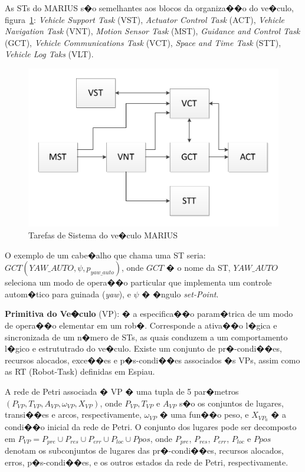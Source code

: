 As STs do MARIUS s�o semelhantes aos blocos da organiza��o do ve�culo,
figura~\ref{SILVA_2}:
\emph{Vehicle Support Task} (VST), \emph{Actuator Control Task} (ACT),
\emph{Vehicle Navigation Task} (VNT), \emph{Motion Sensor Task} (MST),
\emph{Guidance and Control Task} (GCT), \emph{Vehicle Communications Task}
(VCT), \emph{Space and Time Task} (STT), \emph{Vehicle Log Taks} (VLT). 

\begin{figure}[H]
\centering
\includegraphics[width=1\columnwidth]{figs/SILVA_2.pdf}
\caption{Tarefas de Sistema do ve�culo MARIUS}
\label{SILVA_2}
\end{figure}

O exemplo de um cabe�alho que chama uma ST seria:
$GCT(YAW\_AUTO,\psi,p_{yaw\_auto})$, onde $GCT$ � o nome da ST, $YAW\_AUTO$
seleciona um modo de opera��o particular que implementa um controle autom�tico
para guinada (\emph{yaw}), e $\psi$ � �ngulo \emph{set-Point}.

\textbf{Primitiva do Ve�culo} (VP): � a especifica��o param�trica de um modo
de opera��o elementar em um rob�. Corresponde a ativa��o l�gica e sincronizada
de um n�mero de STs, as quais conduzem a um comportamento l�gico e estrututrado
do ve�culo. Existe um conjunto de pr�-condi��es, recursos alocados, exce��es e
p�s-condi��es associados �s VPs, assim como as RT (Robot-Task) definidas em
Espiau.

A rede de Petri associada � VP � uma tupla de 5 par�metros
$(P_{VP},T_{VP},A_{VP},\omega_{VP},X_{VP})$, onde $P_{VP},T_{VP}$ e $A_{VP}$ s�o
os conjuntos de lugares, transi��es e arcos, respectivamente, $\omega_{VP}$ �
uma fun��o peso, e $X_{VP_{0}}$ � a condi��o inicial da rede de Petri. O
conjunto dos lugares pode ser decomposto em $P_{VP}=P_{pre}\cup P_{res}\cup
P_{err}\cup P_{loc}\cup P{pos}$, onde $P_{pre}$, $P_{res}$, $P_{err}$,
$P_{loc}$ e $P{pos}$ denotam os subconjuntos de lugares das pr�-condi��es,
recursos alocados, erros, p�s-condi��es, e os outros estados da rede de Petri,
respectivamente.

